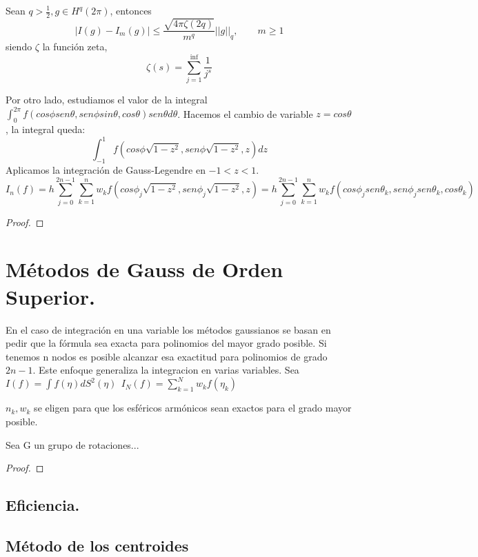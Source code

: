 \begin{thm}Sean $q > \frac{1}{2}, g\in H^q(2\pi)$, entonces
	$$
	| I(g) - I_m(g) | \le \frac{\sqrt{4\pi\zeta(2q)}}{m^q} ||g||_q, \qquad m\ge 1
	$$  
	siendo $\zeta$ la función zeta,
	$$\zeta(s) = \sum_{j=1}^{\inf} \frac{1}{j^s}$$
\end{thm}

Por otro lado, estudiamos el valor de la integral $\int_{0}^{2\pi} f(cos\phi sen\theta,sen\phi sin\theta,cos\theta)sen\theta d\theta$. Hacemos el cambio de variable $z= cos\theta$, la integral queda:
$$
\int_{-1}^{1} f(cos\phi\sqrt{1-z^2},sen \phi\sqrt{1-z^2},z) dz 
$$
Aplicamos la integración de Gauss-Legendre en $-1<z<1$.
$$
I_n(f) = h \sum_{j=0}^{2n-1} \sum_{k=1}^{n} w_k f(cos \phi_j\sqrt{1-z^2}, sen\phi_j\sqrt{1-z^2},z) = h \sum_{j=0}^{2n-1} \sum_{k=1}^{n} w_k f(cos \phi_jsen\theta_k, sen\phi_jsen\theta_k,cos\theta_k)
$$
\begin{thm}
	
\end{thm}
\begin{proof}
	
\end{proof}
\section{Métodos de Gauss de Orden Superior.}
En el caso de integración en una variable los métodos gaussianos se basan en pedir que la fórmula sea exacta para polinomios del mayor grado posible. Si tenemos n nodos es posible alcanzar esa exactitud para polinomios de grado $2n-1$. Este enfoque generaliza la integracion en varias variables. Sea $I(f)= \int f(\eta)dS^2(\eta) ~~ I_N(f) = \sum_{k=1}^{N} w_kf(\eta_k)$

${n_k},{w_k}$ se eligen para que los esféricos armónicos sean exactos para el grado mayor posible.

\begin{thm}
	Sea G un grupo de rotaciones...
\end{thm}
\begin{proof}
\end{proof}

\subsection{Eficiencia.}

\subsection{Método de los centroides}

